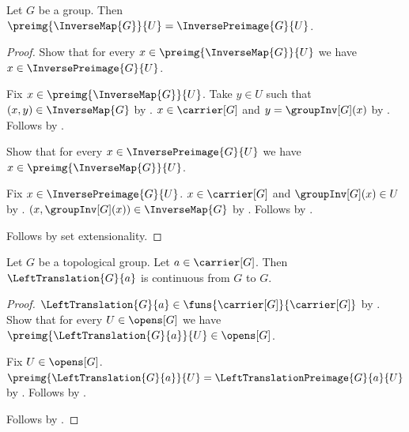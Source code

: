 \begin{lemma}\label{inverse_map_set_preimage}
    Let $G$ be a group.
    Then $\preimg{\InverseMap{G}}{U}=\InversePreimage{G}{U}$.
\end{lemma}
\begin{proof}
    Show that for every $x\in\preimg{\InverseMap{G}}{U}$ we have
        $x\in\InversePreimage{G}{U}$.
    \begin{subproof}
        Fix $x\in\preimg{\InverseMap{G}}{U}$.
        Take $y\in U$ such that $(x,y)\in\InverseMap{G}$
            by .
        $x\in\carrier[G]$ and $y=\groupInv[G](x)$
            by .
        Follows by .
    \end{subproof}
    Show that for every $x\in\InversePreimage{G}{U}$ we have
        $x\in\preimg{\InverseMap{G}}{U}$.
    \begin{subproof}
        Fix $x\in\InversePreimage{G}{U}$.
        $x\in\carrier[G]$ and $\groupInv[G](x)\in U$
            by .
        $(x,\groupInv[G](x))\in\InverseMap{G}$
            by .
        Follows by .
    \end{subproof}
    Follows by set extensionality.
\end{proof}

\begin{theorem}\label{left_translation_continuous}
    Let $G$ be a topological group.
    Let $a\in\carrier[G]$.
    Then $\LeftTranslation{G}{a}$ is continuous from $G$ to $G$.
\end{theorem}
\begin{proof}
    $\LeftTranslation{G}{a}\in
        \funs{\carrier[G]}{\carrier[G]}$
        by .
    Show that for every $U\in\opens[G]$ we have
        $\preimg{\LeftTranslation{G}{a}}{U}\in\opens[G]$.
    \begin{subproof}
        Fix $U\in\opens[G]$.
        $\preimg{\LeftTranslation{G}{a}}{U}
            =\LeftTranslationPreimage{G}{a}{U}$
            by .
        Follows by .
    \end{subproof}
    Follows by .
\end{proof}


